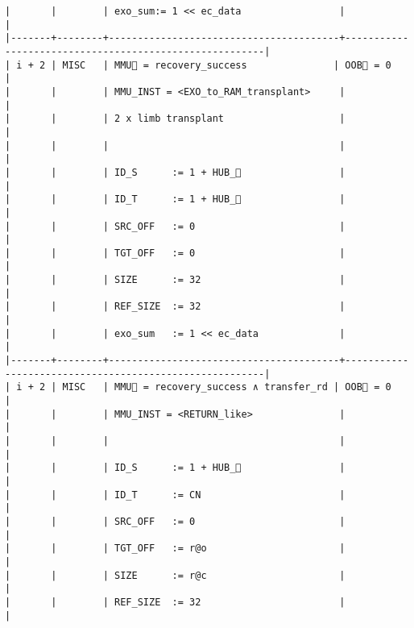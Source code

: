 \documentclass[varwidth=\maxdimen,margin=0.5cm,multi={verbatim}]{standalone}
\begin{document}
\begin{verbatim}
|       |        | exo_sum:= 1 << ec_data                 |                                                        |
|-------+--------+----------------------------------------+--------------------------------------------------------|
| i + 2 | MISC   | MMU🏴 = recovery_success               | OOB🏴 = 0                                              |
|       |        | MMU_INST = <EXO_to_RAM_transplant>     |                                                        |
|       |        | 2 x limb transplant                    |                                                        |
|       |        |                                        |                                                        |
|       |        | ID_S      := 1 + HUB_                 |                                                        |
|       |        | ID_T      := 1 + HUB_                 |                                                        |
|       |        | SRC_OFF   := 0                         |                                                        |
|       |        | TGT_OFF   := 0                         |                                                        |
|       |        | SIZE      := 32                        |                                                        |
|       |        | REF_SIZE  := 32                        |                                                        |
|       |        | exo_sum   := 1 << ec_data              |                                                        |
|-------+--------+----------------------------------------+--------------------------------------------------------|
| i + 2 | MISC   | MMU🏴 = recovery_success ∧ transfer_rd | OOB🏴 = 0                                              |
|       |        | MMU_INST = <RETURN_like>               |                                                        |
|       |        |                                        |                                                        |
|       |        | ID_S      := 1 + HUB_                 |                                                        |
|       |        | ID_T      := CN                        |                                                        |
|       |        | SRC_OFF   := 0                         |                                                        |
|       |        | TGT_OFF   := r@o                       |                                                        |
|       |        | SIZE      := r@c                       |                                                        |
|       |        | REF_SIZE  := 32                        |                                                        |

\end{verbatim}
\end{document}
